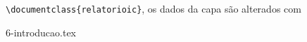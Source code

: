 \verb|\documentclass{relatorioic}|, os dados da capa são alterados com
\begin{document}
{6-introducao.tex}
\end{document}
